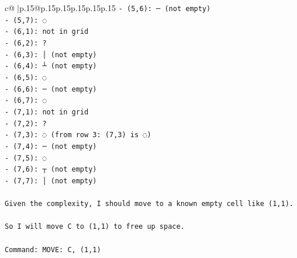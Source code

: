 \documentclass{article}
\begin{document}
{\begin{supertabular}{c@{$\;$}|p{.15\linewidth}@{}p{.15\linewidth}p{.15\linewidth}p{.15\linewidth}p{.15\linewidth}p{.15\linewidth}}
{{{\texttt{{-} (5,6): ─ (not empty)} \\
\texttt{{-} (5,7): ◌} \\
\texttt{{-} (6,1): not in grid} \\
\texttt{{-} (6,2): ?} \\
\texttt{{-} (6,3): │ (not empty)} \\
\texttt{{-} (6,4): ┴ (not empty)} \\
\texttt{{-} (6,5): ◌} \\
\texttt{{-} (6,6): ─ (not empty)} \\
\texttt{{-} (6,7): ◌} \\
\texttt{{-} (7,1): not in grid} \\
\texttt{{-} (7,2): ?} \\
\texttt{{-} (7,3): ◌ (from row 3: (7,3) is ◌)} \\
\texttt{{-} (7,4): ─ (not empty)} \\
\texttt{{-} (7,5): ◌} \\
\texttt{{-} (7,6): ┬ (not empty)} \\
\texttt{{-} (7,7): │ (not empty)} \\
\\ 
\texttt{Given the complexity, I should move to a known empty cell like (1,1).} \\
\\ 
\texttt{So I will move C to (1,1) to free up space.} \\
\\ 
\texttt{Command: MOVE: C, (1,1)} \\
            }
        }
    }
     \\ \\


\end{supertabular}}
\end{document}
